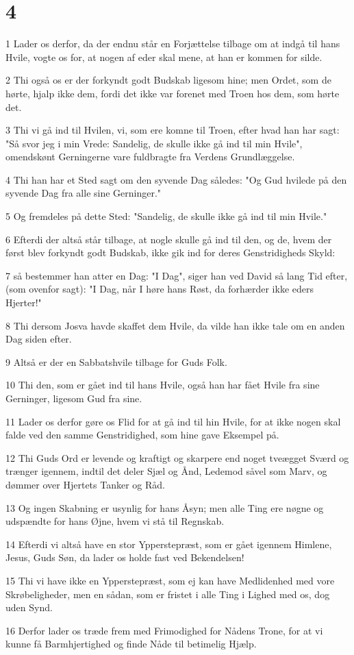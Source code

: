 \chapter{4}

\par 1 Lader os derfor, da der endnu står en Forjættelse tilbage om at indgå til hans Hvile, vogte os for, at nogen af eder skal mene, at han er kommen for silde.
\par 2 Thi også os er der forkyndt godt Budskab ligesom hine; men Ordet, som de hørte, hjalp ikke dem, fordi det ikke var forenet med Troen hos dem, som hørte det.
\par 3 Thi vi gå ind til Hvilen, vi, som ere komne til Troen, efter hvad han har sagt: "Så svor jeg i min Vrede: Sandelig, de skulle ikke gå ind til min Hvile", omendskønt Gerningerne vare fuldbragte fra Verdens Grundlæggelse.
\par 4 Thi han har et Sted sagt om den syvende Dag således: "Og Gud hvilede på den syvende Dag fra alle sine Gerninger."
\par 5 Og fremdeles på dette Sted: "Sandelig, de skulle ikke gå ind til min Hvile."
\par 6 Efterdi der altså står tilbage, at nogle skulle gå ind til den, og de, hvem der først blev forkyndt godt Budskab, ikke gik ind for deres Genstridigheds Skyld:
\par 7 så bestemmer han atter en Dag: "I Dag", siger han ved David så lang Tid efter, (som ovenfor sagt): "I Dag, når I høre hans Røst, da forhærder ikke eders Hjerter!"
\par 8 Thi dersom Josva havde skaffet dem Hvile, da vilde han ikke tale om en anden Dag siden efter.
\par 9 Altså er der en Sabbatshvile tilbage for Guds Folk.
\par 10 Thi den, som er gået ind til hans Hvile, også han har fået Hvile fra sine Gerninger, ligesom Gud fra sine.
\par 11 Lader os derfor gøre os Flid for at gå ind til hin Hvile, for at ikke nogen skal falde ved den samme Genstridighed, som hine gave Eksempel på.
\par 12 Thi Guds Ord er levende og kraftigt og skarpere end noget tveægget Sværd og trænger igennem, indtil det deler Sjæl og Ånd, Ledemod såvel som Marv, og dømmer over Hjertets Tanker og Råd.
\par 13 Og ingen Skabning er usynlig for hans Åsyn; men alle Ting ere nøgne og udspændte for hans Øjne, hvem vi stå til Regnskab.
\par 14 Efterdi vi altså have en stor Ypperstepræst, som er gået igennem Himlene, Jesus, Guds Søn, da lader os holde fast ved Bekendelsen!
\par 15 Thi vi have ikke en Ypperstepræst, som ej kan have Medlidenhed med vore Skrøbeligheder, men en sådan, som er fristet i alle Ting i Lighed med os, dog uden Synd.
\par 16 Derfor lader os træde frem med Frimodighed for Nådens Trone, for at vi kunne få Barmhjertighed og finde Nåde til betimelig Hjælp.

